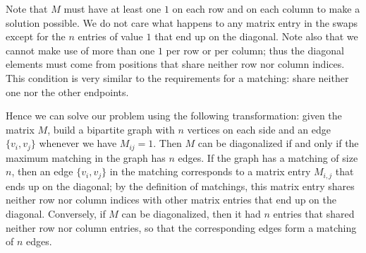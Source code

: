 \documentclass[11pt]{article}
\begin{document}
Note that $M$ must have at least one $1$ on each row and on each column to
make a solution possible.  We do not care what happens to any matrix entry
in the swaps except for the $n$ entries of value $1$ that end up on the
diagonal.  Note also that we cannot make use of more than one $1$ per row
or per column; thus the diagonal elements must come from positions that
share neither row nor column indices.  This condition is very similar to
the requirements for a matching: share neither one nor the other endpoints.

Hence we can solve our problem using the following transformation:
given the matrix $M$, build a bipartite graph with $n$ vertices on each
side and an edge $\{v_i,v_j\}$ whenever we have $M_{ij}=1$.  Then $M$ can
be diagonalized if and only if the maximum matching in the graph has $n$ edges.
If the graph has a matching of size $n$, then an edge $\{v_i,v_j\}$ in the
matching corresponds to a matrix entry $M_{i,j}$ that ends up on the diagonal;
by the definition of matchings, this matrix entry shares neither row nor column
indices with other matrix entries that end up on the diagonal.
Conversely, if $M$ can be diagonalized, then it had $n$ entries that
shared neither row nor column entries, so that the corresponding edges form
a matching of $n$ edges.
\end{document}

